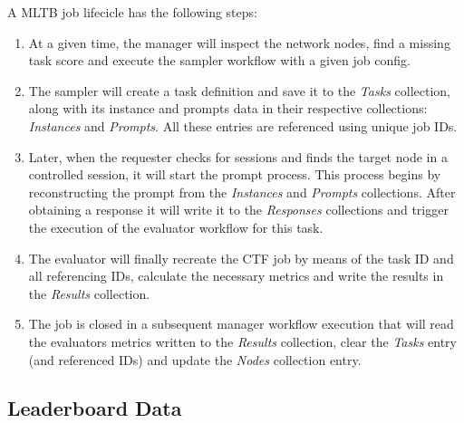 A \gls{MLTB} job lifecicle has the following steps:
\begin{enumerate}
    \item At a given time, the manager will inspect the network nodes, find a missing task score and execute the sampler workflow with a given job config.
    \item The sampler will create a task definition and save it to the \emph{Tasks} collection, along with its instance and prompts data in their respective collections: \emph{Instances} and \emph{Prompts}. All these entries are referenced using unique job IDs. 
    \item Later, when the requester checks for sessions and finds the target node in a controlled session, it will start the prompt process. This process begins by reconstructing the prompt from the \emph{Instances} and \emph{Prompts} collections. After obtaining a response it will write it to the \emph{Responses} collections and trigger the execution of the evaluator workflow for this task.
    \item The evaluator will finally recreate the \gls{CTF} job by means of the task ID and all referencing IDs, calculate the necessary metrics and write the results in the \emph{Results} collection.
    \item The job is closed in a subsequent manager workflow execution that will read the evaluators metrics written to the \emph{Results} collection, clear the \emph{Tasks} entry (and referenced IDs) and update the \emph{Nodes} collection entry. 
\end{enumerate}


\subsection{Leaderboard Data}

